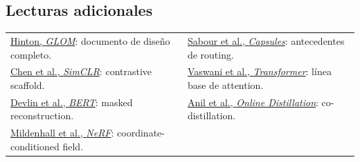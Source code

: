 \documentclass[a4paper]{article}
\begin{document}
\subsection{Lecturas adicionales}

\begin{center}
\footnotesize
\begin{tabularx}{\textwidth}{>{\raggedright\arraybackslash}X>{\raggedright\arraybackslash}X}
\href{https://arxiv.org/abs/2102.12627}{Hinton, \emph{GLOM}}: documento de diseño completo. &
\href{https://arxiv.org/abs/1710.09829}{Sabour et al., \emph{Capsules}}: antecedentes de routing. \\[0.25em]
\href{https://arxiv.org/abs/2002.05709}{Chen et al., \emph{SimCLR}}: contrastive scaffold. &
\href{https://arxiv.org/abs/1706.03762}{Vaswani et al., \emph{Transformer}}: línea base de attention. \\[0.25em]
\href{https://arxiv.org/abs/1810.04805}{Devlin et al., \emph{BERT}}: masked reconstruction. &
\href{https://arxiv.org/abs/1804.03235}{Anil et al., \emph{Online Distillation}}: co-distillation. \\[0.25em]
\href{https://arxiv.org/abs/2003.08934}{Mildenhall et al., \emph{NeRF}}: coordinate-conditioned field. & \\
\end{tabularx}
\end{center}
\end{document}
